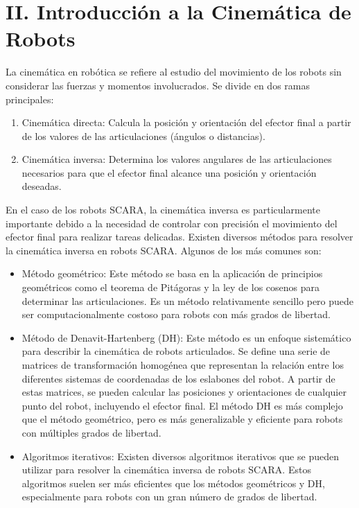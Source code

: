 \documentclass[final]{foresj}
\begin{document}
\section{II. Introducción a la Cinemática de Robots}

La cinemática en robótica se refiere al estudio del movimiento de los robots sin considerar las fuerzas y momentos involucrados. Se divide en dos ramas principales:

\begin{enumerate}
\item Cinemática directa: Calcula la posición y orientación del efector final a partir de los valores de las articulaciones (ángulos o distancias).
\item Cinemática inversa: Determina los valores angulares de las articulaciones necesarios para que el efector final alcance una posición y orientación deseadas.
\end{enumerate}

En el caso de los robots SCARA, la cinemática inversa es particularmente importante debido a la necesidad de controlar con precisión el movimiento del efector final para realizar tareas delicadas. Existen diversos métodos para resolver la cinemática inversa en robots SCARA. Algunos de los más comunes son:

\begin{itemize}
\item Método geométrico: Este método se basa en la aplicación de principios geométricos como el teorema de Pitágoras y la ley de los cosenos para determinar las articulaciones. Es un método relativamente sencillo pero puede ser computacionalmente costoso para robots con más grados de libertad.
\item Método de Denavit-Hartenberg (DH): Este método es un enfoque sistemático para describir la cinemática de robots articulados. Se define una serie de matrices de transformación homogénea que representan la relación entre los diferentes sistemas de coordenadas de los eslabones del robot. A partir de estas matrices, se pueden calcular las posiciones y orientaciones de cualquier punto del robot, incluyendo el efector final. El método DH es más complejo que el método geométrico, pero es más generalizable y eficiente para robots con múltiples grados de libertad.
\item Algoritmos iterativos: Existen diversos algoritmos iterativos que se pueden utilizar para resolver la cinemática inversa de robots SCARA. Estos algoritmos suelen ser más eficientes que los métodos geométricos y DH, especialmente para robots con un gran número de grados de libertad.
\end{itemize}
\end{document}
